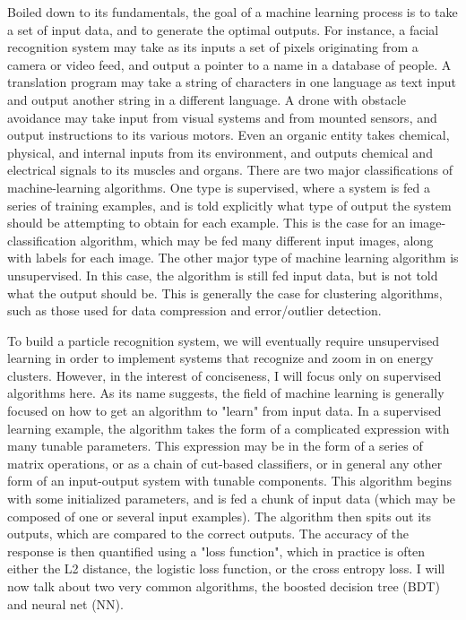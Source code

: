 \documentclass{article}
\begin{document}
Boiled down to its fundamentals, the goal of a machine learning process is  to take a set of input data, and to generate the optimal outputs. For instance, a facial recognition system may take as its inputs a set of pixels originating from a camera or video feed, and output a pointer to a name in a database of people. A translation program may take a string of characters in one language as text input and output another string in a different language. A drone with obstacle avoidance may take input from visual systems and from mounted sensors, and output instructions to its various motors. Even an organic entity takes chemical, physical, and internal inputs from its environment, and outputs chemical and electrical signals to its muscles and organs. There are two major classifications of machine-learning algorithms. One type is supervised, where a system is fed a series of training examples, and is told explicitly what type of output the system should be attempting to obtain for each example. This is the case for an image-classification algorithm, which may be fed many different input images, along with labels for each image. The other major type of machine learning algorithm is unsupervised. In this case, the algorithm is still fed input data, but is not told what the output should be. This is generally the case for clustering algorithms, such as those used for data compression and error/outlier detection.

To build a particle recognition system, we will eventually require unsupervised learning in order to implement systems that recognize and zoom in on energy clusters. However, in the interest of conciseness, I will focus only on supervised algorithms here. As its name suggests, the field of machine learning is generally focused on how to get an algorithm to "learn" from input data. In a supervised learning example, the algorithm takes the form of a complicated expression with many tunable parameters. This expression may be in the form of a series of matrix operations, or as a chain of cut-based classifiers, or in general any other form of an input-output system with tunable components. This algorithm begins with some initialized parameters, and is fed a chunk of input data (which may be composed of one or several input examples). The algorithm then spits out its outputs, which are compared to the correct outputs. The accuracy of the response is then quantified using a "loss function", which in practice is often either the L2 distance, the logistic loss function, or the cross entropy loss. I will now talk about two very common algorithms, the boosted decision tree (BDT) and neural net (NN).
\end{document}
